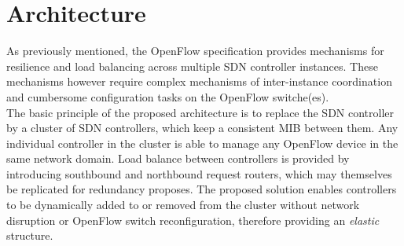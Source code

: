 
\chapter{Architecture}
\label{chapter:architecture}
As previously mentioned, the OpenFlow specification provides mechanisms for resilience and load balancing across multiple \gls{SDN} controller instances.
These mechanisms however require complex mechanisms of inter-instance coordination and cumbersome configuration tasks on the OpenFlow switche(es).\\
%
The basic principle of the proposed architecture is to replace the \gls{SDN} controller by a cluster of \gls{SDN} controllers, which keep a consistent \gls{MIB} between them.
Any individual controller in the cluster is able to manage any OpenFlow device in the same network domain.
Load balance between controllers is provided by introducing southbound and northbound request routers, which may themselves be replicated for redundancy proposes.
The proposed solution enables controllers to be dynamically added to or removed from the cluster without network disruption or OpenFlow switch reconfiguration, therefore providing an \emph{elastic} structure.
%
